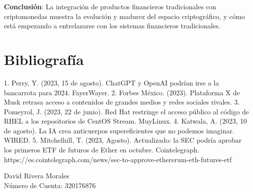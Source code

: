 \documentclass{article}
\begin{document}
\textbf{Conclusión}: La integración de productos financieros tradicionales con criptomonedas muestra la evolución y madurez del espacio criptográfico, y cómo está empezando a entrelazarse con los sistemas financieros tradicionales.

\section*{Bibliografía}

1. Perry, Y. (2023, 15 de agosto). ChatGPT y OpenAI podrían irse a la bancarrota para 2024. FayerWayer.
2. Forbes México. (2023). Plataforma X de Musk retrasa acceso a contenidos de grandes medios y redes sociales rivales.
3. Pomeyrol, J. (2023, 22 de junio). Red Hat restringe el acceso público al código de RHEL a los repositorios de CentOS Stream. MuyLinux.
4. Katwala, A. (2023, 10 de agosto). La IA crea anticuerpos supereficientes que no podemos imaginar. WIRED.
5. Mitchelhill, T. (2023, Agosto). Actualizado: la SEC podría aprobar los primeros ETF de futuros de Ether en octubre. Cointelegraph. https://es.cointelegraph.com/news/sec-to-approve-ethererum-eth-futures-etf

\vspace{1cm}
\noindent
David Rivera Morales \\
Número de Cuenta: 320176876
\end{document}
